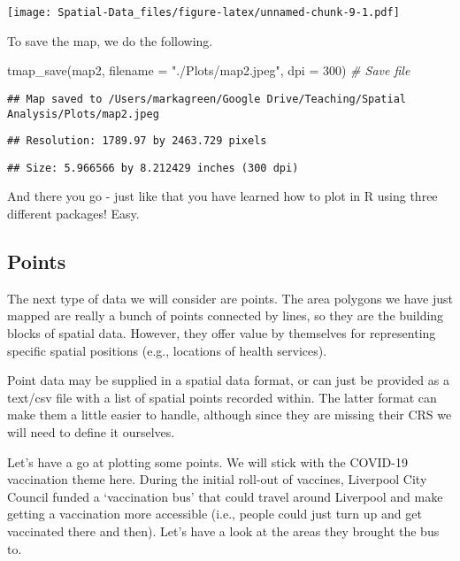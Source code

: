 \documentclass[
]{book}
\newenvironment{Shaded}{\begin{snugshade}}{\end{snugshade}}
\newcommand{\AttributeTok}[1]{\textcolor[rgb]{0.77,0.63,0.00}{#1}}
\newcommand{\CommentTok}[1]{\textcolor[rgb]{0.56,0.35,0.01}{\textit{#1}}}
\newcommand{\DecValTok}[1]{\textcolor[rgb]{0.00,0.00,0.81}{#1}}
\newcommand{\FunctionTok}[1]{\textcolor[rgb]{0.00,0.00,0.00}{#1}}
\newcommand{\NormalTok}[1]{#1}
\newcommand{\StringTok}[1]{\textcolor[rgb]{0.31,0.60,0.02}{#1}}
\begin{document}
\texttt{[image: Spatial-Data\_files/figure-latex/unnamed-chunk-9-1.pdf]}

To save the map, we do the following.

\begin{Shaded}
\begin{Highlighting}[]
\FunctionTok{tmap\_save}\NormalTok{(map2, }\AttributeTok{filename =} \StringTok{"./Plots/map2.jpeg"}\NormalTok{, }\AttributeTok{dpi =} \DecValTok{300}\NormalTok{) }\CommentTok{\# Save file}
\end{Highlighting}
\end{Shaded}

\begin{verbatim}
## Map saved to /Users/markagreen/Google Drive/Teaching/Spatial Analysis/Plots/map2.jpeg
\end{verbatim}

\begin{verbatim}
## Resolution: 1789.97 by 2463.729 pixels
\end{verbatim}

\begin{verbatim}
## Size: 5.966566 by 8.212429 inches (300 dpi)
\end{verbatim}

And there you go - just like that you have learned how to plot in R using three different packages! Easy.

\hypertarget{points}{%
\subsection{Points}\label{points}}

The next type of data we will consider are points. The area polygons we have just mapped are really a bunch of points connected by lines, so they are the building blocks of spatial data. However, they offer value by themselves for representing specific spatial positions (e.g., locations of health services).

Point data may be supplied in a spatial data format, or can just be provided as a text/csv file with a list of spatial points recorded within. The latter format can make them a little easier to handle, although since they are missing their CRS we will need to define it ourselves.

Let's have a go at plotting some points. We will stick with the COVID-19 vaccination theme here. During the initial roll-out of vaccines, Liverpool City Council funded a `vaccination bus' that could travel around Liverpool and make getting a vaccination more accessible (i.e., people could just turn up and get vaccinated there and then). Let's have a look at the areas they brought the bus to.
\end{document}
